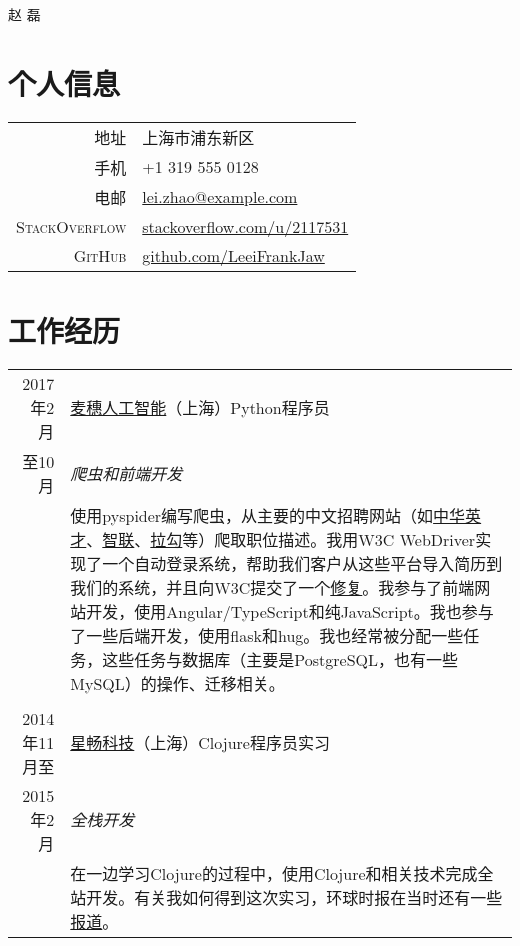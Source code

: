 \documentclass[a4paper,11pt]{article}
\begin{document}
\pagestyle{empty} %


\par{\centering
		{\Huge 赵 磊
	}\bigskip\par}

\section{个人信息}

\begin{tabular}{rl}
  \textsc{地址}          & 上海市浦东新区 \\
  \textsc{手机}          & +1 319 555 0128 \\
  \textsc{电邮}          & \href{mailto:lei.zhao@example.com}{\color{linkcolour}lei.zhao@example.com} \\
  \textsc{StackOverflow} & \href{https://stackoverflow.com/users/2117531/lei-zhao}{\color{linkcolour}stackoverflow.com/u/2117531} \\
  \textsc{GitHub}        & \href{https://github.com/LeeiFrankJaw}{\color{linkcolour}github.com/LeeiFrankJaw}
\end{tabular}

\section{工作经历}
\begin{tabular}{r|p{11cm}}
  2017年2月    & \href{https://www.mesoor.com/}{麦穗人工智能}（上海）\hfill Python程序员 \\
  至10月       & \emph{爬虫和前端开发}\\
               & \footnotesize 使用pyspider编写爬虫，从主要的中文招聘网站（如\href{http://www.chinahr.com/}{中华英才}、\href{https://www.zhaopin.com/}{智联}、\href{https://www.lagou.com/}{拉勾}等）爬取职位描述。我用W3C WebDriver实现了一个自动登录系统，帮助我们客户从这些平台导入简历到我们的系统，并且向W3C提交了一个\href{https://github.com/w3c/web-platform-tests/pull/6743}{修复}。我参与了前端网站开发，使用Angular/TypeScript和纯JavaScript。我也参与了一些后端开发，使用flask和hug。我也经常被分配一些任务，这些任务与数据库（主要是PostgreSQL，也有一些MySQL）的操作、迁移相关。\\
  \multicolumn{2}{c}{} \\
  2014年11月至 & \href{http://www.starworking.com/}{星畅科技}（上海）\hfill Clojure程序员实习 \\
  2015年2月    & \emph{全栈开发}\\
               & \footnotesize 在一边学习Clojure的过程中，使用Clojure和相关技术完成全站开发。有关我如何得到这次实习，环球时报在当时还有一些\href{http://www.globaltimes.cn/content/871111.shtml}{报道}。
\end{tabular}
\end{document}
